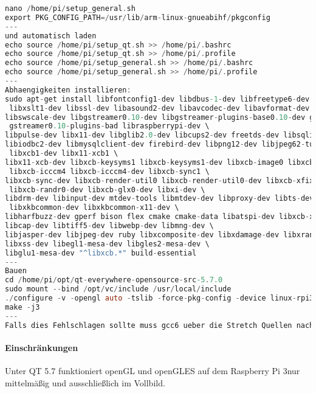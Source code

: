 \begin{lstlisting}[frame=single,breaklines=true,basicstyle=\tiny,language=C,label={QT5.7compile},caption={Skizze zur Installation von Qt5.7}]
nano /home/pi/setup_general.sh
export PKG_CONFIG_PATH=/usr/lib/arm-linux-gnueabihf/pkgconfig
---
und automatisch laden
echo source /home/pi/setup_qt.sh >> /home/pi/.bashrc
echo source /home/pi/setup_qt.sh >> /home/pi/.profile
echo source /home/pi/setup_general.sh >> /home/pi/.bashrc
echo source /home/pi/setup_general.sh >> /home/pi/.profile
---
Abhaengigkeiten installieren:
sudo apt-get install libfontconfig1-dev libdbus-1-dev libfreetype6-dev libudev-dev libicu-dev libsqlite3-dev \
 libxslt1-dev libssl-dev libasound2-dev libavcodec-dev libavformat-dev \
libswscale-dev libgstreamer0.10-dev libgstreamer-plugins-base0.10-dev gstreamer-tools gstreamer0.10-plugins-good \
 gstreamer0.10-plugins-bad libraspberrypi-dev \
libpulse-dev libx11-dev libglib2.0-dev libcups2-dev freetds-dev libsqlite0-dev libpq-dev \
libiodbc2-dev libmysqlclient-dev firebird-dev libpng12-dev libjpeg62-turbo-dev libgst-dev libxext-dev libxcb1 \
 libxcb1-dev libx11-xcb1 \
libx11-xcb-dev libxcb-keysyms1 libxcb-keysyms1-dev libxcb-image0 libxcb-image0-dev libxcb-shm0 libxcb-shm0-dev \
 libxcb-icccm4 libxcb-icccm4-dev libxcb-sync1 \
libxcb-sync-dev libxcb-render-util0 libxcb-render-util0-dev libxcb-xfixes0-dev libxrender-dev libxcb-shape0-dev \
 libxcb-randr0-dev libxcb-glx0-dev libxi-dev \ 
libdrm-dev libinput-dev mtdev-tools libmtdev-dev libproxy-dev libts-dev pkg-config pulseaudio libxcb-xkb-dev \
 libxkbcommon-dev libxkbcommon-x11-dev \ 
libharfbuzz-dev gperf bison flex cmake cmake-data libatspi-dev libxcb-xinlibxcb-xinerama0 libxcb-xinerama0-dev \ 
libcap-dev libtiff5-dev libwebp-dev libmng-dev \ 
libjasper-dev libjpeg-dev ruby libxcomposite-dev libxdamage-dev libxrandr-dev libxtst-dev libpci-dev libnss3-dev \ 
libxss-dev libegl1-mesa-dev libgles2-mesa-dev \
libglu1-mesa-dev "^libxcb.*" build-essential
---
Bauen
cd /home/pi/opt/qt-everywhere-opensource-src-5.7.0
sudo mount --bind /opt/vc/include /usr/local/include
./configure -v -opengl auto -tslib -force-pkg-config -device linux-rpi3-g++ -device-option CROSS_COMPILE=/usr/bin/ -opensource -confirm-license -optimized-qmake -reduce-exports -release -qt-pcre -make libs -make tools -skip qtwebengine -nomake examples -no-use-gold-linker -prefix /usr/local/qt5
make -j3
---
Falls dies Fehlschlagen sollte muss gcc6 ueber die Stretch Quellen nachinstalliert werden.
\end{lstlisting}
\paragraph{Einschränkungen}$\;$\\
Unter QT 5.7 funktioniert openGL und openGLES auf dem \glqq Raspberry Pi 3\grqq nur mittelmäßig und ausschließlich im Vollbild.
